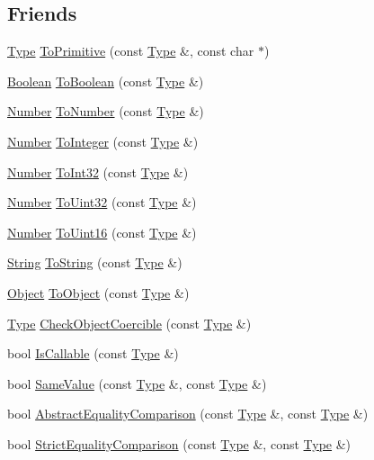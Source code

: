 \subsection*{Friends}
\begin{DoxyCompactItemize}
\item 
\hyperlink{class_type}{Type} \hyperlink{class_type_ab93b9585041e82792e33de6f7eacb5f4}{To\+Primitive} (const \hyperlink{class_type}{Type} \&, const char $\ast$)
\item 
\hyperlink{struct_boolean}{Boolean} \hyperlink{class_type_ac4625c21a844f06bfb4d4fe0d90ab781}{To\+Boolean} (const \hyperlink{class_type}{Type} \&)
\item 
\hyperlink{struct_number}{Number} \hyperlink{class_type_a0b2401b5884928a806b431da0b8114b1}{To\+Number} (const \hyperlink{class_type}{Type} \&)
\item 
\hyperlink{struct_number}{Number} \hyperlink{class_type_a828ad4c60bd60a33336cd7b3e919e53b}{To\+Integer} (const \hyperlink{class_type}{Type} \&)
\item 
\hyperlink{struct_number}{Number} \hyperlink{class_type_a95e159f5fe19a5aa297da9d7d06347da}{To\+Int32} (const \hyperlink{class_type}{Type} \&)
\item 
\hyperlink{struct_number}{Number} \hyperlink{class_type_adf104091b3326711c9de0cc2c691df0a}{To\+Uint32} (const \hyperlink{class_type}{Type} \&)
\item 
\hyperlink{struct_number}{Number} \hyperlink{class_type_acc847f7cb96eb525a1cca35ce6e575aa}{To\+Uint16} (const \hyperlink{class_type}{Type} \&)
\item 
\hyperlink{struct_string}{String} \hyperlink{class_type_a3a55c50f81af046525d7e158a2625e57}{To\+String} (const \hyperlink{class_type}{Type} \&)
\item 
\hyperlink{struct_object}{Object} \hyperlink{class_type_ac73ac7844a40bcd630b4be9d49b88b45}{To\+Object} (const \hyperlink{class_type}{Type} \&)
\item 
\hyperlink{class_type}{Type} \hyperlink{class_type_aa64e7c736bb488746fa28a526d381f53}{Check\+Object\+Coercible} (const \hyperlink{class_type}{Type} \&)
\item 
bool \hyperlink{class_type_a891f7c233613f70b05bc4f9403498c8e}{Is\+Callable} (const \hyperlink{class_type}{Type} \&)
\item 
bool \hyperlink{class_type_a9970cda2e5a3a4beab27346bf77ec13d}{Same\+Value} (const \hyperlink{class_type}{Type} \&, const \hyperlink{class_type}{Type} \&)
\item 
bool \hyperlink{class_type_afd48ec25622d42183a8c9daaf4f470df}{Abstract\+Equality\+Comparison} (const \hyperlink{class_type}{Type} \&, const \hyperlink{class_type}{Type} \&)
\item 
bool \hyperlink{class_type_aca07020739c6731d8f674adc21e97edd}{Strict\+Equality\+Comparison} (const \hyperlink{class_type}{Type} \&, const \hyperlink{class_type}{Type} \&)
\end{DoxyCompactItemize}


